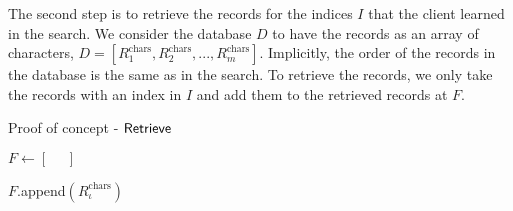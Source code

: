 The second step is to retrieve the records for the indices $ I $ that the client learned in the search. We consider the database $ D $ to have the records as an array of characters, $ D = \left[ R^{\mathrm{chars}}_1, R^{\mathrm{chars}}_2, ... , R^{\mathrm{chars}}_m \right] $. Implicitly, the order of the records in the database is the same as in the search. To retrieve the records, we only take the records with an index in $ I $ and add them to the retrieved records at $ F $.

\begin{algorithm}[tbh]
    \LinesNumbered
    \caption{Proof of concept - $ \mathsf{{Retrieve}} $}
    \label{algo:Retrieval}

    \vspace*{0.48cm}

    $ F \gets \left[ \phantom{=}\right] $

     {
         {
            $ F $.append$ \left(R^{\mathrm{chars}}_{\iota}\right) $
        }
    }

    \vspace*{0.48cm}

\end{algorithm}

